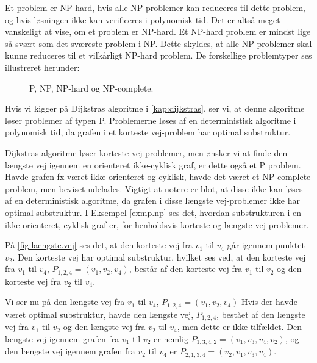 Et problem er NP-hard, hvis alle NP problemer kan reduceres til dette problem, og hvis løsningen ikke kan verificeres i polynomisk tid. Det er altså meget vanskeligt at vise, om et problem er NP-hard. Et NP-hard problem er mindst lige så svært som det sværeste problem i NP. Dette skyldes, at alle NP problemer skal kunne reduceres til et vilkårligt NP-hard problem.
De forskellige problemtyper ses illustreret herunder:




\begin{figure}[H]
\centering
	\caption{P, NP, NP-hard og NP-complete.}
	\label{fig.dijkstraexmp}
\end{figure}

Hvis vi kigger på Dijkstras algoritme i \autoref{kap:dijkstras}, ser vi, at denne algoritme løser problemer af typen P. Problemerne løses af en deterministisk algoritme i polynomisk tid, da grafen i et korteste vej-problem har optimal substruktur.

Dijkstras algoritme løser korteste vej-problemer, men ønsker vi at finde den længste vej igennem en orienteret ikke-cyklisk graf, er dette også et P problem. Havde grafen fx været ikke-orienteret og cyklisk, havde det været et NP-complete problem, men beviset udelades. Vigtigt at notere er blot, at disse ikke kan løses af en deterministisk algoritme, da grafen i disse længste vej-problemer ikke har optimal substruktur.
I Eksempel \ref{exmp.np} ses det, hvordan substrukturen i en ikke-orienteret, cyklisk graf er, for henholdsvis korteste og længste vej-problemer.

\begin{exmp} \label{exmp.np}
På \autoref{fig:laengste.vej} ses det, at den korteste vej  fra $v_1$ til $v_4$ går igennem punktet $v_2$. Den korteste vej har optimal substruktur, hvilket ses ved, at den korteste vej fra $v_{1}$ til $v_{4}$, $P_{1,2,4}=(v_{1},v_{2},v_{4})$, består af den korteste vej fra $v_{1}$ til $v_{2}$ og den korteste vej fra $v_{2}$ til $v_{4}$. 

Vi ser nu på den længste vej fra $v_1$ til $v_4$, $P_{1,2,4}=(v_{1},v_{2},v_{4})$ Hvis der havde været optimal substruktur, havde den længste vej, $P_{1,2,4}$, bestået af den længste vej fra $v_{1}$ til $v_{2}$ og den længste vej fra $v_{2}$ til $v_{4}$, men dette er ikke tilfældet. Den længste vej igennem grafen fra $v_{1}$ til $v_{2}$ er nemlig $P_{1,3,4,2}=(v_{1},v_{3},v_{4},v_{2})$, og den længste vej igennem grafen fra $v_{2}$ til $v_{4}$ er $P_{2,1,3,4}=(v_{2},v_{1},v_{3},v_{4})$. 






\end{exmp}


